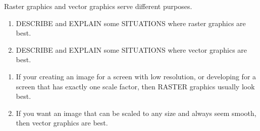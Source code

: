 \documentclass[noauthor,nooutcomes,12pt,hints,handout]{ximera}
\begin{document}
\begin{question}
  Raster graphics and vector graphics serve different purposes.
  \begin{enumerate}
  \item DESCRIBE and EXPLAIN some SITUATIONS where raster graphics are best.
  \item DESCRIBE and EXPLAIN some SITUATIONS where vector graphics are best.
  \end{enumerate}
  \begin{freeResponse}
    \begin{enumerate}
    \item If your creating an image for a screen with low resolution,
      or developing for a screen that has exactly one scale factor,
      then RASTER graphics usually look best.
    \item If you want an image that can be scaled to any size and
      always seem smooth, then vector graphics are best.
    \end{enumerate}
  \end{freeResponse}
\end{question}
\mynewpage
\end{document}
